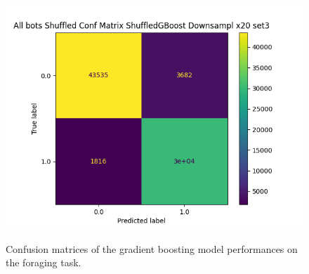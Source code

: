 \documentclass[../../Thesis.tex]{subfiles}
\begin{document}
\begin{figure}
{							\includegraphics[scale=0.31]{../../Images/Experiments/foraging_images/All_bots_Shuffled_Conf_Matrix_ShuffledGBoost_Downsampl_x20_set3.png}
					}
					\caption{Confusion matrices of the gradient boosting model performances on the foraging task.}
					\label{fig:foraging_confusion_matrices}
				\end{figure}
\end{document}
